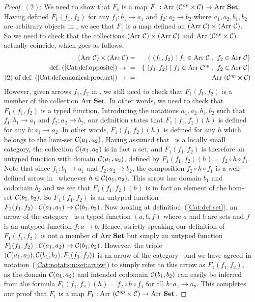 \begin{proof}
    $(2)$: We need to show that $F_{1}$ is a map $F_{1}:\mbox{\rm Arr}\ (\mbox{${\cal C}^{op}$}\times\mbox{$\cal C$})
    \to\mbox{\rm Arr}\ \mbox{\bf Set}$. Having defined $F_{1}(f_{1},f_{2})$ for any $f_{1}:b_{1}\to
    a_{1}$ and $f_{2}:a_{2}\to b_{2}$ where $a_{1},a_{2},b_{1},b_{2}$ are 
    arbitrary objects in \Cat, we see that $F_{1}$ is a map defined 
    on $(\arr\ \Cat)\times(\arr\ \Cat)$. So we need to check that the collections
    $(\arr\ \Cat)\times(\arr\ \Cat)$ and $\mbox{\rm Arr}\ (\mbox{${\cal C}^{op}$}\times\mbox{$\cal C$})$ actually
    coincide, which goes as follows:
        \begin{eqnarray*}(\arr\ \Cat)\times(\arr\ \Cat)
            &=&\{\ (f_{1},f_{2})\ |\ f_{1}\in\arr\ \Cat\ ,\ f_{2}\in\arr\ \Cat\}\\
            \mbox{def.~(\ref{Cat:def:opposite})\ $\to$\ }
            &=&\{\ (f_{1},f_{2})\ |\ f_{1}\in\arr\ \Cop\ ,\ f_{2}\in\arr\ \Cat\}\\
            \mbox{$(2)$ of def.~(\ref{Cat:def:canonical:product})\ $\to$\ }
            &=&\arr\ (\Cop\times\Cat)
        \end{eqnarray*}
    However, given arrows $f_{1}, f_{2}$ in \Cat, we still need to check that
    $F_{1}(f_{1},f_{2})$ is a member of the collection $\arr\ \Set$. In other
    words, we need to check that $F_{1}(f_{1},f_{2})$ is a typed function. 
    Introducing the notations $a_{1},a_{2},b_{1},b_{2}$ such that 
    $f_{1}:b_{1}\to a_{1}$ and $f_{2}:a_{2}\to b_{2}$, our definition states 
    that $F_{1}(f_{1},f_{2})(h)$ is defined for any $h:a_{1}\to a_{2}$. In other 
    words, $F_{1}(f_{1},f_{2})(h)$ is defined for any $h$ which belongs to the 
    hom-set $\mbox{$\cal C$}(a_{1},a_{2})$. Having assumed that \Cat\ is a locally small 
    category, the collection $\mbox{$\cal C$}(a_{1},a_{2})$ is in fact a set, and 
    $F_{1}(f_{1},f_{2})$ is therefore an untyped function with domain 
    $\mbox{$\cal C$}(a_{1},a_{2})$, defined by $F_{1}(f_{1},f_{2})(h)=f_{2}\circ 
    h\circ f_{1}$. Note that since
    $f_{1}:b_{1}\to a_{1}$ and $f_{2}:a_{2}\to b_{2}$, the composition
    $f_{2}\circ h\circ f_{1}$ is a well-defined arrow in \Cat\ whenever 
    $h\in\mbox{$\cal C$}(a_{1},a_{2})$. This arrow has domain $b_{1}$ and codomain 
    $b_{2}$ and we see that $F_{1}(f_{1},f_{2})(h)$ is in fact an element
    of the hom-set $\mbox{$\cal C$}(b_{1},b_{2})$. So $F_{1}(f_{1},f_{2})$ is an 
    untyped function $F_{1}(f_{1},f_{2}):\mbox{$\cal C$}(a_{1},a_{1})\to\mbox{$\cal C$}(b_{1},b_{2})$.
    Now looking at definition~(\ref{Cat:def:set}), an arrow of the category
    \Set\ is a typed function $(a,b,f)$ where $a$ and $b$ are sets and $f$ is 
    an untyped function $f:a\to b$. Hence, strictly speaking our definition of 
    $F_{1}(f_{1},f_{2})$ is not a member of $\arr\ \Set$ but simply an untyped 
    function $F_{1}(f_{1},f_{2}): \mbox{$\cal C$}(a_{1},a_{2})\to\mbox{$\cal C$}(b_{1},b_{2})$. 
    However, the triple 
    $(\mbox{$\cal C$}(a_{1},a_{2}),\mbox{$\cal C$}(b_{1},b_{2}),F_{1}(f_{1},f_{2}))$ is an arrow
    of the category \Set\ and we have agreed in 
    notation~(\ref{Cat:notation:set:arrow}) to simply refer to this arrow as
    $F_{1}(f_{1},f_{2})$, as the domain $\mbox{$\cal C$}(a_{1},a_{2})$ and intended
    codomain $\mbox{$\cal C$}(b_{1},b_{2})$ can easily be inferred from the formula
    $F_{1}(f_{1},f_{2})(h) = f_{2}\circ h\circ f_{1}$ for all $h:a_{1}\to 
    a_{2}$. This completes our proof that $F_{1}$ is a map $F_{1}:
    \mbox{\rm Arr}\ (\mbox{${\cal C}^{op}$}\times\mbox{$\cal C$})\to\mbox{\rm Arr}\ \mbox{\bf Set}$.


\end{proof}
